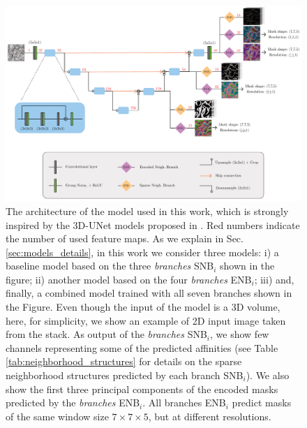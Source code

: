 \begin{figure}[t]
\centering
        \includegraphics[width=\textwidth]{./figs/UNet_architecture.pdf} %
        \vspace{1em}
        \caption{The architecture of the model used in this work, which is strongly inspired by the 3D-UNet models proposed in \cite{lee2017superhuman,funke2018large}. 
        Red numbers indicate the number of used feature maps.
        As we explain in Sec. \ref{sec:models_details}, in this work we consider three models: i) a baseline model based on the three \emph{\sparseBr branches} SNB$_{i}$ shown in the figure; ii) another model based on the four \emph{\encBr branches} ENB$_i$; iii) and, finally, a combined model trained with all seven branches shown in the Figure.
        Even though the input of the model is a 3D volume, here, for simplicity, we show an example of 2D input image taken from the stack. As output of the \emph{\sparseBr branches} SNB$_i$, we show few channels representing some of the predicted affinities (see Table \ref{tab:neighborhood_structures} for details on the sparse neighborhood structures predicted by each branch SNB$_i$). We also show the first three principal components of the encoded masks predicted by the \emph{\encBr branches} ENB$_i$. All branches ENB$_i$ predict \maskname masks of the same window size $7 \times 7 \times 5$, but at different resolutions.}
    \label{fig:model_architecture}
\end{figure}

